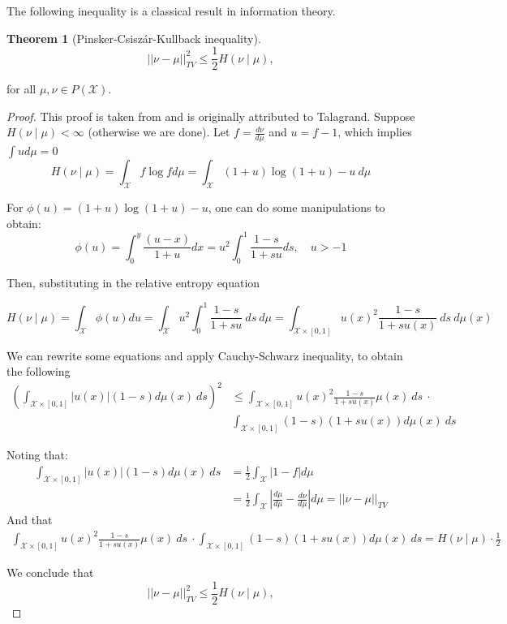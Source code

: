 \documentclass[10pt]{article}
\theoremstyle{definition}
\newtheorem{theorem}{Theorem}
\begin{document}
The following inequality is a classical result in information theory.
\begin{theorem}[Pinsker-Csiszár-Kullback inequality]
$$
|| \nu - \mu ||^2_{TV} \leq \frac{1}{2}H(\nu \mid \mu),
$$

for all $\mu,\nu \in P(\mathcal X)$.
\end{theorem}

\begin{proof}
	This proof is taken from \citet{gozlan2010transport} and is originally attributed
	to Talagrand. Suppose $H(\nu \mid \mu) < \infty$ (otherwise we are done). Let
	$f = \frac{d\nu}{d\mu}$ and $u = f - 1$, which implies $\int u d\mu = 0$
	$$
	H(\nu \mid \mu) = \int_\mathcal X f \log f d\mu  =
	\int_\mathcal X (1+u) \log(1+u) - u \ d\mu
	$$

	For $\phi(u) = (1+u)\log(1+u) - u$, one can do some manipulations to obtain:
	$$
	\phi(u) = \int_0^y \frac{(u-x)}{1+u} dx = u^2 \int^1_0 \frac{1-s}{1+su} ds,
	\quad u > -1
	$$

	Then, substituting in the relative entropy equation

	$$
	H(\nu \mid \mu) = \int_\mathcal X \phi(u) du  =
	\int_\mathcal X u^2
	\int_0^1 \frac{1-s}{1+su} \ ds \ d\mu =
	\int_{\mathcal X \times [0,1]} u(x)^2\frac{1-s}{1+su(x)} \ ds \ d\mu(x)
	$$

	We can rewrite some equations and apply Cauchy-Schwarz inequality, to obtain the
	following
	\begin{align*}
		\left(\int_{\mathcal X \times [0,1]} |u(x)|(1-s)d\mu(x) \ ds
		\right)^2
		&\leq 
		\int_{\mathcal X \times [0,1]} u(x)^2\frac{1-s}{1+su(x)} \mu(x) \ ds \ \cdot \\
		&\int_{\mathcal X \times [0,1]} (1-s)(1+su(x))d\mu(x) \ ds
	\end{align*}


	Noting that:
	\begin{align*}
		\int_{\mathcal X \times [0,1]} |u(x)|(1-s)d\mu(x) \ ds
		&=
		\frac{1}{2}\int_\mathcal X |1 - f| d\mu
		\\
		&= \frac{1}{2}\int_\mathcal X \left|\frac{d\mu}{d\mu} - \frac{d\nu}{d\mu}
		\right| d\mu = || \nu - \mu ||_{TV}
	\end{align*}
	And that
	\begin{align*}
		\int_{\mathcal X \times [0,1]} u(x)^2\frac{1-s}{1+su(x)} \mu(x) \ ds \ \cdot \int_{\mathcal X \times [0,1]} (1-s)(1+su(x))d\mu(x) \ ds = 
		H(\nu \mid \mu) \cdot \frac{1}{2}
	\end{align*}

	We conclude that
$$
|| \nu - \mu ||^2_{TV} \leq \frac{1}{2}H(\nu \mid \mu),
$$


\end{proof}
\end{document}
